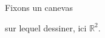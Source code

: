 \documentclass[preview]{standalone}
\begin{document}
\begin{center}
Fixons un canevas

sur lequel dessiner, ici $\mathbb{R}^2$.
\end{center}
\end{document}
